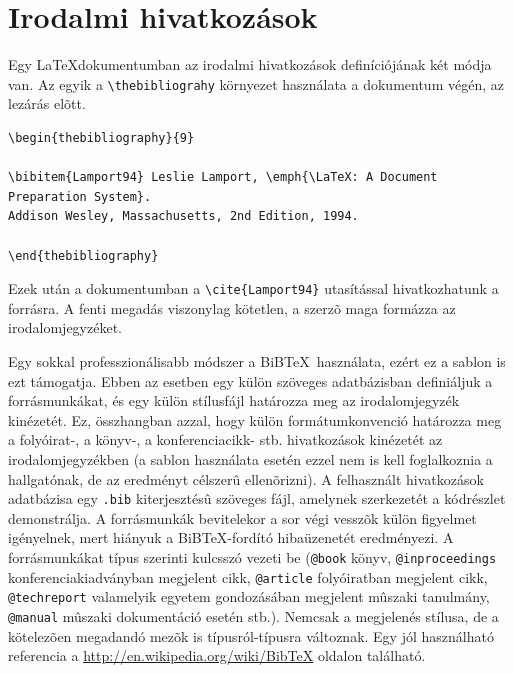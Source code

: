 \section{Irodalmi hivatkozások}\label{sect:HowtoReference}
Egy \LaTeX dokumentumban az irodalmi hivatkozások definíciójának két módja van. Az egyik a \verb+\thebibliograhy+ környezet használata a dokumentum végén, az \verb++ lezárás elõtt.
\begin{lstlisting}[frame=single,float=!ht]
\begin{thebibliography}{9}

\bibitem{Lamport94} Leslie Lamport, \emph{\LaTeX: A Document Preparation System}. 
Addison Wesley, Massachusetts, 2nd Edition, 1994.

\end{thebibliography}
\end{lstlisting}

Ezek után a dokumentumban a \verb+\cite{Lamport94}+ utasítással hivatkozhatunk a forrásra. A fenti megadás viszonylag kötetlen, a szerzõ maga formázza az irodalomjegyzéket. 

Egy sokkal professzionálisabb módszer a BiB\TeX~használata, ezért ez a sablon is ezt támogatja. Ebben az esetben egy külön szöveges adatbázisban definiáljuk a forrásmunkákat, és egy külön stílusfájl határozza meg az irodalomjegyzék kinézetét. Ez, összhangban azzal, hogy külön formátumkonvenció határozza meg a folyóirat-, a könyv-, a konferenciacikk- stb. hivatkozások kinézetét az irodalomjegyzékben (a sablon használata esetén ezzel nem is kell foglalkoznia a hallgatónak, de az eredményt célszerû ellenõrizni). A felhasznált hivatkozások adatbázisa egy \verb+.bib+ kiterjesztésû szöveges fájl, amelynek szerkezetét a  kódrészlet demonstrálja. A forrásmunkák bevitelekor a sor végi vesszõk külön figyelmet igényelnek, mert hiányuk a BiB\TeX-fordító hibaüzenetét eredményezi. A forrásmunkákat típus szerinti kulcsszó vezeti be (\verb+@book+ könyv, \verb+@inproceedings+ konferenciakiadványban megjelent cikk, \verb+@article+ folyóiratban megjelent cikk, \verb+@techreport+ valamelyik egyetem gondozásában megjelent mûszaki tanulmány, \verb+@manual+ mûszaki dokumentáció esetén stb.). Nemcsak a megjelenés stílusa, de a kötelezõen megadandó mezõk is típusról-típusra változnak. Egy jól használható referencia a \url{http://en.wikipedia.org/wiki/BibTeX} oldalon található.
\begin{lstlisting}[frame=single,float=!ht,caption=Példa szöveges irodalomjegyzék-adatbázisra BiBTeX használata esetén., label=listing:Bibtex]

\end{lstlisting}


